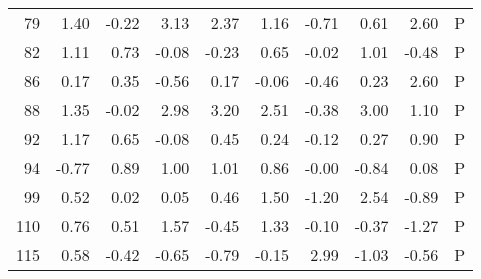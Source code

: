 \begin{table}[ht]
\begin{tabular}{rrrrrrrrrl}
  79 & 1.40 & -0.22 & 3.13 & 2.37 & 1.16 & -0.71 & 0.61 & 2.60 & P \\ 
  82 & 1.11 & 0.73 & -0.08 & -0.23 & 0.65 & -0.02 & 1.01 & -0.48 & P \\ 
  86 & 0.17 & 0.35 & -0.56 & 0.17 & -0.06 & -0.46 & 0.23 & 2.60 & P \\ 
  88 & 1.35 & -0.02 & 2.98 & 3.20 & 2.51 & -0.38 & 3.00 & 1.10 & P \\ 
  92 & 1.17 & 0.65 & -0.08 & 0.45 & 0.24 & -0.12 & 0.27 & 0.90 & P \\ 
  94 & -0.77 & 0.89 & 1.00 & 1.01 & 0.86 & -0.00 & -0.84 & 0.08 & P \\ 
  99 & 0.52 & 0.02 & 0.05 & 0.46 & 1.50 & -1.20 & 2.54 & -0.89 & P \\ 
  110 & 0.76 & 0.51 & 1.57 & -0.45 & 1.33 & -0.10 & -0.37 & -1.27 & P \\ 
  115 & 0.58 & -0.42 & -0.65 & -0.79 & -0.15 & 2.99 & -1.03 & -0.56 & P \\ 
   \hline
\end{tabular}
\end{table}

